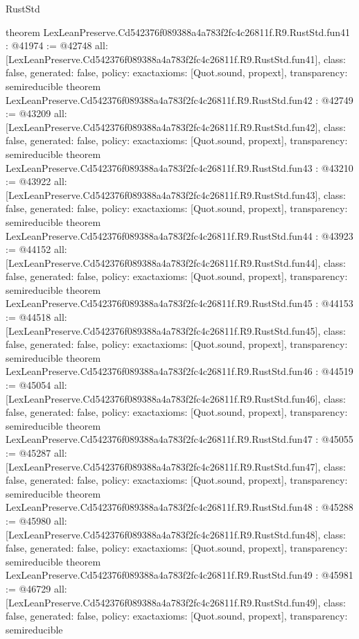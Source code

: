 \begin{lexlean}{RustStd}
\begin{coremodule}
{}
theorem LexLeanPreserve.Cd542376f089388a4a783f2fc4c26811f.R9.RustStd.fun41 : @41974 := @42748 {
  all: [LexLeanPreserve.Cd542376f089388a4a783f2fc4c26811f.R9.RustStd.fun41],
  class: false,
  generated: false,
  policy: exact{axioms: [Quot.sound, propext]},
  transparency: semireducible
}
theorem LexLeanPreserve.Cd542376f089388a4a783f2fc4c26811f.R9.RustStd.fun42 : @42749 := @43209 {
  all: [LexLeanPreserve.Cd542376f089388a4a783f2fc4c26811f.R9.RustStd.fun42],
  class: false,
  generated: false,
  policy: exact{axioms: [Quot.sound, propext]},
  transparency: semireducible
}
theorem LexLeanPreserve.Cd542376f089388a4a783f2fc4c26811f.R9.RustStd.fun43 : @43210 := @43922 {
  all: [LexLeanPreserve.Cd542376f089388a4a783f2fc4c26811f.R9.RustStd.fun43],
  class: false,
  generated: false,
  policy: exact{axioms: [Quot.sound, propext]},
  transparency: semireducible
}
theorem LexLeanPreserve.Cd542376f089388a4a783f2fc4c26811f.R9.RustStd.fun44 : @43923 := @44152 {
  all: [LexLeanPreserve.Cd542376f089388a4a783f2fc4c26811f.R9.RustStd.fun44],
  class: false,
  generated: false,
  policy: exact{axioms: [Quot.sound, propext]},
  transparency: semireducible
}
theorem LexLeanPreserve.Cd542376f089388a4a783f2fc4c26811f.R9.RustStd.fun45 : @44153 := @44518 {
  all: [LexLeanPreserve.Cd542376f089388a4a783f2fc4c26811f.R9.RustStd.fun45],
  class: false,
  generated: false,
  policy: exact{axioms: [Quot.sound, propext]},
  transparency: semireducible
}
theorem LexLeanPreserve.Cd542376f089388a4a783f2fc4c26811f.R9.RustStd.fun46 : @44519 := @45054 {
  all: [LexLeanPreserve.Cd542376f089388a4a783f2fc4c26811f.R9.RustStd.fun46],
  class: false,
  generated: false,
  policy: exact{axioms: [Quot.sound, propext]},
  transparency: semireducible
}
theorem LexLeanPreserve.Cd542376f089388a4a783f2fc4c26811f.R9.RustStd.fun47 : @45055 := @45287 {
  all: [LexLeanPreserve.Cd542376f089388a4a783f2fc4c26811f.R9.RustStd.fun47],
  class: false,
  generated: false,
  policy: exact{axioms: [Quot.sound, propext]},
  transparency: semireducible
}
theorem LexLeanPreserve.Cd542376f089388a4a783f2fc4c26811f.R9.RustStd.fun48 : @45288 := @45980 {
  all: [LexLeanPreserve.Cd542376f089388a4a783f2fc4c26811f.R9.RustStd.fun48],
  class: false,
  generated: false,
  policy: exact{axioms: [Quot.sound, propext]},
  transparency: semireducible
}
theorem LexLeanPreserve.Cd542376f089388a4a783f2fc4c26811f.R9.RustStd.fun49 : @45981 := @46729 {
  all: [LexLeanPreserve.Cd542376f089388a4a783f2fc4c26811f.R9.RustStd.fun49],
  class: false,
  generated: false,
  policy: exact{axioms: [Quot.sound, propext]},
  transparency: semireducible
}
\end{coremodule}
\end{lexlean}
